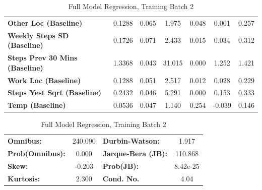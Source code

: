 \begin{table}
\begin{tabular}{lcccccc}
\textbf{Other Loc (Baseline)}          &       0.1288  &        0.065     &     1.975  &         0.048        &        0.001    &        0.257     \\
\textbf{Weekly Steps SD (Baseline)}    &       0.1726  &        0.071     &     2.433  &         0.015        &        0.034    &        0.312     \\
\textbf{Steps Prev 30 Mins (Baseline)} &       1.3368  &        0.043     &    31.015  &         0.000        &        1.252    &        1.421     \\
\textbf{Work Loc (Baseline)}           &       0.1288  &        0.051     &     2.517  &         0.012        &        0.028    &        0.229     \\
\textbf{Steps Yest Sqrt (Baseline)}    &       0.2432  &        0.046     &     5.291  &         0.000        &        0.153    &        0.333     \\
\textbf{Temp (Baseline)}               &       0.0536  &        0.047     &     1.140  &         0.254        &       -0.039    &        0.146     \\
\bottomrule
\end{tabular}
\begin{tabular}{lclc}
\textbf{Omnibus:}       & 240.090 & \textbf{  Durbin-Watson:     } &    1.917  \\
\textbf{Prob(Omnibus):} &   0.000 & \textbf{  Jarque-Bera (JB):  } &  110.868  \\
\textbf{Skew:}          &  -0.203 & \textbf{  Prob(JB):          } & 8.42e-25  \\
\textbf{Kurtosis:}      &   2.300 & \textbf{  Cond. No.          } &     4.04  \\
\bottomrule
\end{tabular}
\caption{Full Model Regression, Training Batch 2}
\end{table}

\medskip

